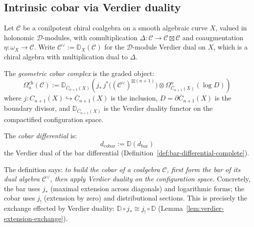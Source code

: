 \subsection{Intrinsic cobar via Verdier duality}\label{subsec:intrinsic-cobar}

\begin{definition}\label{def:geom-cobar-intrinsic}
Let $\mathcal{C}$ be a conilpotent chiral coalgebra on a smooth algebraic
curve $X$, valued in holonomic $\mathcal{D}$-modules, with comultiplication
$\Delta\colon \mathcal{C} \to \mathcal{C} \boxtimes \mathcal{C}$ and
coaugmentation $\eta\colon \omega_X \to \mathcal{C}$.  Write
$\mathcal{C}^\vee := \mathbb{D}_X(\mathcal{C})$ for the $\mathcal{D}$-module
Verdier dual on $X$, which is a chiral algebra with multiplication dual to
$\Delta$.

The \emph{geometric cobar complex} is the graded object:
\[
\Omega^{\mathrm{ch}}_n(\mathcal{C})
:= \mathbb{D}_{\overline{C}_{n+1}(X)}\!\left(
  j_*\, j^*\bigl((\mathcal{C}^\vee)^{\boxtimes(n+1)}\bigr)
  \otimes \Omega^n_{\overline{C}_{n+1}(X)}(\log D)
\right)
\]
where $j\colon C_{n+1}(X) \hookrightarrow \overline{C}_{n+1}(X)$ is the
inclusion, $D = \partial\overline{C}_{n+1}(X)$ is the boundary divisor, and
$\mathbb{D}_{\overline{C}_{n+1}(X)}$ is the Verdier duality functor on the
compactified configuration space.

The \emph{cobar differential} is:
\[
d_{\mathrm{cobar}} := \mathbb{D}(d_{\mathrm{bar}})
\]
the Verdier dual of the bar differential
(Definition~\ref{def:bar-differential-complete}).
\end{definition}

\begin{remark}\label{rem:cobar-intrinsic-meaning}
The definition says: \emph{to build the cobar of a coalgebra $\mathcal{C}$,
first form the bar of its dual algebra $\mathcal{C}^\vee$, then apply
Verdier duality on the configuration space.}  Concretely, the bar uses
$j_*$ (maximal extension across diagonals) and logarithmic forms; the cobar
uses $j_!$ (extension by zero) and distributional sections.  This is
precisely the exchange effected by Verdier duality:
$\mathbb{D} \circ j_* \cong j_! \circ \mathbb{D}$
(Lemma~\ref{lem:verdier-extension-exchange}).
\end{remark}

